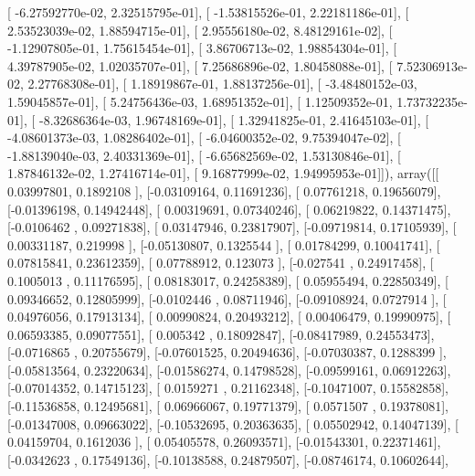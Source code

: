 \documentclass{article}
\begin{document}
       [ -6.27592770e-02,   2.32515795e-01],
       [ -1.53815526e-01,   2.22181186e-01],
       [  2.53523039e-02,   1.88594715e-01],
       [  2.95556180e-02,   8.48129161e-02],
       [ -1.12907805e-01,   1.75615454e-01],
       [  3.86706713e-02,   1.98854304e-01],
       [  4.39787905e-02,   1.02035707e-01],
       [  7.25686896e-02,   1.80458088e-01],
       [  7.52306913e-02,   2.27768308e-01],
       [  1.18919867e-01,   1.88137256e-01],
       [ -3.48480152e-03,   1.59045857e-01],
       [  5.24756436e-03,   1.68951352e-01],
       [  1.12509352e-01,   1.73732235e-01],
       [ -8.32686364e-03,   1.96748169e-01],
       [  1.32941825e-01,   2.41645103e-01],
       [ -4.08601373e-03,   1.08286402e-01],
       [ -6.04600352e-02,   9.75394047e-02],
       [ -1.88139040e-03,   2.40331369e-01],
       [ -6.65682569e-02,   1.53130846e-01],
       [  1.87846132e-02,   1.27416714e-01],
       [  9.16877999e-02,   1.94995953e-01]]), array([[ 0.03997801,  0.1892108 ],
       [-0.03109164,  0.11691236],
       [ 0.07761218,  0.19656079],
       [-0.01396198,  0.14942448],
       [ 0.00319691,  0.07340246],
       [ 0.06219822,  0.14371475],
       [-0.0106462 ,  0.09271838],
       [ 0.03147946,  0.23817907],
       [-0.09719814,  0.17105939],
       [ 0.00331187,  0.219998  ],
       [-0.05130807,  0.1325544 ],
       [ 0.01784299,  0.10041741],
       [ 0.07815841,  0.23612359],
       [ 0.07788912,  0.123073  ],
       [-0.027541  ,  0.24917458],
       [ 0.1005013 ,  0.11176595],
       [ 0.08183017,  0.24258389],
       [ 0.05955494,  0.22850349],
       [ 0.09346652,  0.12805999],
       [-0.0102446 ,  0.08711946],
       [-0.09108924,  0.0727914 ],
       [ 0.04976056,  0.17913134],
       [ 0.00990824,  0.20493212],
       [ 0.00406479,  0.19990975],
       [ 0.06593385,  0.09077551],
       [ 0.005342  ,  0.18092847],
       [-0.08417989,  0.24553473],
       [-0.0716865 ,  0.20755679],
       [-0.07601525,  0.20494636],
       [-0.07030387,  0.1288399 ],
       [-0.05813564,  0.23220634],
       [-0.01586274,  0.14798528],
       [-0.09599161,  0.06912263],
       [-0.07014352,  0.14715123],
       [ 0.0159271 ,  0.21162348],
       [-0.10471007,  0.15582858],
       [-0.11536858,  0.12495681],
       [ 0.06966067,  0.19771379],
       [ 0.0571507 ,  0.19378081],
       [-0.01347008,  0.09663022],
       [-0.10532695,  0.20363635],
       [ 0.05502942,  0.14047139],
       [ 0.04159704,  0.1612036 ],
       [ 0.05405578,  0.26093571],
       [-0.01543301,  0.22371461],
       [-0.0342623 ,  0.17549136],
       [-0.10138588,  0.24879507],
       [-0.08746174,  0.10602644],
\end{document}
